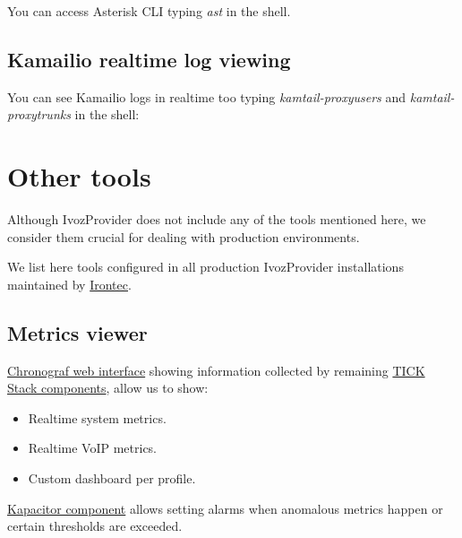 \documentclass[letterpaper,10pt,english]{sphinxmanual}
\begin{document}
\noindent{}

You can access Asterisk CLI typing \emph{ast} in the shell.


\subsection{Kamailio realtime log viewing}
\label{security_and_maintenance/maintenance/log_viewer:kamailio-realtime-log-viewing}
You can see Kamailio logs in realtime too typing \emph{kamtail-proxyusers} and
\emph{kamtail-proxytrunks} in the shell:

\noindent{}


\section{Other tools}
\label{security_and_maintenance/maintenance/other_tools::doc}\label{security_and_maintenance/maintenance/other_tools:other-tools}
Although IvozProvider does not include any of the tools mentioned here, we consider them crucial for dealing with
production environments.

We list here tools configured in all production IvozProvider installations maintained by
\href{https://www.irontec.com}{Irontec}.


\subsection{Metrics viewer}
\label{security_and_maintenance/maintenance/other_tools:metrics-viewer}
\href{https://www.influxdata.com/time-series-platform/chronograf/}{Chronograf web interface}
showing information collected by remaining \href{https://www.influxdata.com/time-series-platform/}{TICK Stack components},
allow us to show:
\begin{itemize}
\item {} 
Realtime system metrics.

\item {} 
Realtime VoIP metrics.

\item {} 
Custom dashboard per profile.

\end{itemize}

\href{https://www.influxdata.com/time-series-platform/kapacitor/}{Kapacitor component} allows setting alarms when anomalous
metrics happen or certain thresholds are exceeded.
\end{document}
